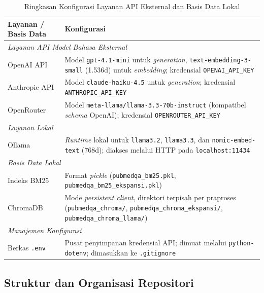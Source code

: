 \begin{table}[H]
\centering
\caption{Ringkasan Konfigurasi Layanan API Eksternal dan Basis Data Lokal}
\label{tbl:layanan-api}
\begin{tabular}{|p{4.3cm}|p{8.7cm}|}
\hline
\textbf{Layanan / Basis Data} & \textbf{Konfigurasi} \\ \hline
\multicolumn{2}{|l|}{\textit{Layanan API Model Bahasa Eksternal}} \\ \hline
OpenAI API           & Model \texttt{gpt-4.1-mini} untuk \textit{generation}, \texttt{text-embedding-3-small} (1.536d) untuk \textit{embedding}; kredensial \texttt{OPENAI\_API\_KEY} \\ \hline
Anthropic API        & Model \texttt{claude-haiku-4.5} untuk \textit{generation}; kredensial \texttt{ANTHROPIC\_API\_KEY} \\ \hline
OpenRouter           & Model \texttt{meta-llama/llama-3.3-70b-instruct} (kompatibel \textit{schema} OpenAI); kredensial \texttt{OPENROUTER\_API\_KEY} \\ \hline
\multicolumn{2}{|l|}{\textit{Layanan Lokal}} \\ \hline
Ollama               & \textit{Runtime} lokal untuk \texttt{llama3.2}, \texttt{llama3.3}, dan \texttt{nomic-embed-text} (768d); diakses melalui HTTP pada \texttt{localhost:11434} \\ \hline
\multicolumn{2}{|l|}{\textit{Basis Data Lokal}} \\ \hline
Indeks BM25          & Format \textit{pickle} (\texttt{pubmedqa\_bm25.pkl}, \texttt{pubmedqa\_bm25\_ekspansi.pkl}) \\ \hline
ChromaDB             & Mode \textit{persistent client}, direktori terpisah per praproses (\texttt{pubmedqa\_chroma/}, \texttt{pubmedqa\_chroma\_ekspansi/}, \texttt{pubmedqa\_chroma\_llama/}) \\ \hline
\multicolumn{2}{|l|}{\textit{Manajemen Konfigurasi}} \\ \hline
Berkas \texttt{.env} & Pusat penyimpanan kredensial API; dimuat melalui \texttt{python-dotenv}; dimasukkan ke \texttt{.gitignore} \\ \hline
\end{tabular}
\end{table}

\subsection{Struktur dan Organisasi Repositori}
\label{subsec:struktur-repo}

